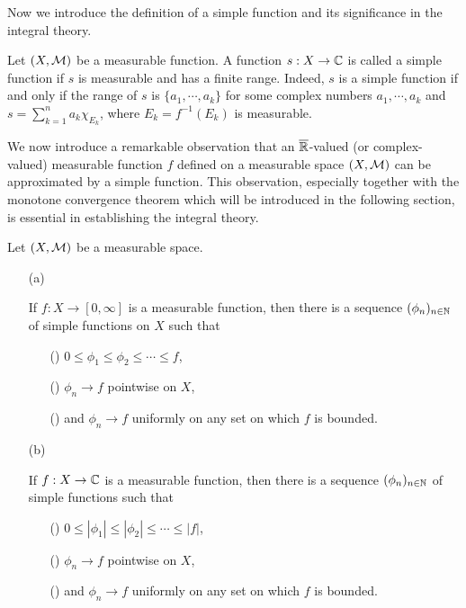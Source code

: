 Now we introduce the definition of a simple function and its significance in the integral theory.
\begin{defi}
    Let $(X, {\mathcal{M}})$ be a measurable function.
    A function $s: X\rightarrow{\mathbb{C}}$ is called a simple function if $s$ is measurable and has a finite range.
    Indeed, $s$ is a simple function if and only if the range of $s$ is $\{a_1, \cdots, a_k\}$ for some complex numbers $a_1, \cdots, a_k$ and $s=\sum_{k=1}^n a_k\chi_{E_k}$, where $E_k=f^{-1}(E_k)$ is measurable.
\end{defi}
We now introduce a remarkable observation that an $\overline{{\mathbb{R}}}$-valued (or complex-valued) measurable function $f$ defined on a measurable space $(X, {\mathcal{M}})$ can be approximated by a simple function.
This observation, especially together with the monotone convergence theorem which will be introduced in the following section, is essential in establishing the integral theory.
\begin{thm}\label{measurable functions as limits of simple functions}
    Let $(X, {\mathcal{M}})$ be a measurable space.
    \begin{enumerate}
        \item[(a)]
        {
            If $f: X\rightarrow[0, \infty]$ is a measurable function, then there is a sequence $(\phi_n)_{n\in{\mathbb{N}}}$ of simple functions on $X$ such that
            \begin{enumerate}
                \item[(\romannumeral 1)]
                {
                    $0\leq\phi_1\leq\phi_2\leq\cdots\leq f$,
                }
                \item[(\romannumeral 2)]
                {
                    $\phi_n\rightarrow f$ pointwise on $X$,
                }
                \item[(\romannumeral 3)]
                {
                    and $\phi_n\rightarrow f$ uniformly on any set on which $f$ is bounded.
                }
            \end{enumerate}
        }
        \item[(b)]
        {
            If $f: X\rightarrow{\mathbb{C}}$ is a measurable function, then there is a sequence $(\phi_n)_{n\in{\mathbb{N}}}$ of simple functions such that
            \begin{enumerate}
                \item[(\romannumeral 1)]
                {
                    $0\leq|\phi_1|\leq|\phi_2|\leq\cdots\leq|f|$,
                }
                \item[(\romannumeral 2)]
                {
                    $\phi_n\rightarrow f$ pointwise on $X$,
                }
                \item[(\romannumeral 3)]
                {
                    and $\phi_n\rightarrow f$ uniformly on any set on which $f$ is bounded.
                }
            \end{enumerate}
        }
    \end{enumerate}
\end{thm}
